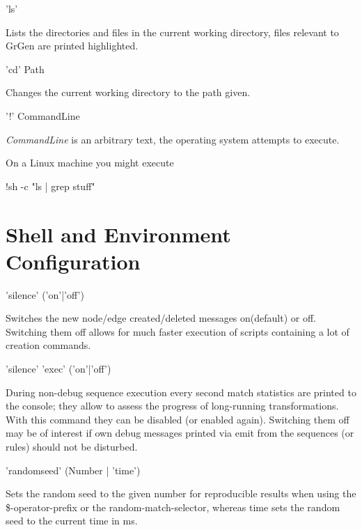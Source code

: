 \begin{rail}
  'ls'
\end{rail}
Lists the directories and files in the current working directory, files relevant to GrGen are printed highlighted.

\begin{rail}
  'cd' Path
\end{rail}
Changes the current working directory to the path given.

\begin{rail}
  '!' CommandLine
\end{rail}
\emph{CommandLine} is an arbitrary text, the operating system attempts to execute.
\begin{example}
On a Linux machine you might execute
\begin{grshell}
!sh -c "ls | grep stuff"
\end{grshell}
\end{example}


\section{Shell and Environment Configuration}

\begin{rail}
'silence' ('on'|'off')
\end{rail}
Switches the new node/edge created/deleted messages on(default) or off.
Switching them off allows for much faster execution of scripts containing a lot of creation commands.

\begin{rail}
'silence' 'exec' ('on'|'off')
\end{rail}
During non-debug sequence execution every second match statistics are printed to the console;
they allow to assess the progress of long-running transformations.
With this command they can be disabled (or enabled again).
Switching them off may be of interest if own debug messages printed via emit from the sequences (or rules) should not be disturbed.

\begin{rail}
'randomseed' (Number | 'time')
\end{rail}
Sets the random seed to the given number for reproducible results when using the \$-operator-prefix or the random-match-selector, whereas time sets the random seed to the current time in ms.

